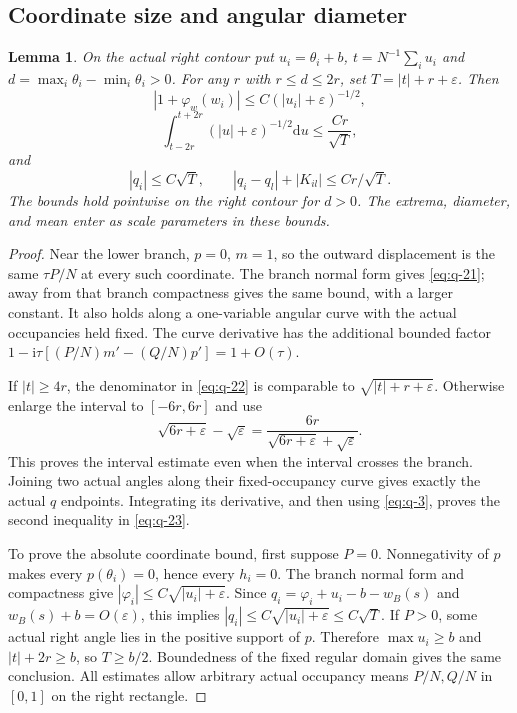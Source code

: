 \documentclass[11pt]{article}
\numberwithin{equation}{section}
\newtheorem{lemma}[theorem]{Lemma}
\theoremstyle{remark}\newtheorem{remark}[theorem]{Remark}
\newcommand{\ii}{\mathrm i}
\newcommand{\dd}{\mathrm d}
\begin{document}
\subsection{Coordinate size and angular diameter}

\begin{lemma}\label{lem:coordinate-scale}
On the actual right contour put
$u_i=\theta_i+b$, $t=N^{-1}\sum_i u_i$ and
$d=\max_i\theta_i-\min_i\theta_i>0$.
For any $r$ with $r\le d\le2r$, set $T=|t|+r+\varepsilon$.
Then
\begin{equation}\label{eq:q-21}
 |1+\varphi_w(w_i)|\le C(|u_i|+\varepsilon)^{-1/2},
\end{equation}
\begin{equation}\label{eq:q-22}
 \int_{t-2r}^{t+2r}(|u|+\varepsilon)^{-1/2}\dd u
       \le\frac{Cr}{\sqrt T},
\end{equation}
and
\begin{equation}\label{eq:q-23}
 |q_i|\le C\sqrt T,\qquad
 |q_i-q_l|+|K_{il}|\le Cr/\sqrt T.
\end{equation}
The bounds hold pointwise on the right contour for $d>0$. The
extrema, diameter, and mean enter as scale parameters in these bounds.
\end{lemma}
\begin{proof}
Near the lower branch, $p=0$, $m=1$, so the outward displacement
is the same $\tau P/N$ at every such coordinate. The branch normal
form gives \eqref{eq:q-21}; away from that branch compactness gives
the same bound, with a larger constant. It also holds along a
one-variable angular curve with the actual occupancies held fixed.
The curve derivative has the additional bounded factor
$1-\ii\tau[(P/N)m'-(Q/N)p']=1+O(\tau)$.

If $|t|\ge4r$, the denominator in \eqref{eq:q-22} is comparable
to $\sqrt{|t|+r+\varepsilon}$. Otherwise enlarge the interval to
$[-6r,6r]$ and use
\[
 \sqrt{6r+\varepsilon}-\sqrt\varepsilon
 =\frac{6r}{\sqrt{6r+\varepsilon}+\sqrt\varepsilon}.
\]
This proves the interval estimate even when the interval crosses
the branch. Joining two actual angles along their fixed-occupancy
curve gives exactly the actual $q$ endpoints. Integrating its
derivative, and then using \eqref{eq:q-3}, proves the second
inequality in \eqref{eq:q-23}.

To prove the absolute coordinate bound, first suppose $P=0$.
Nonnegativity of $p$ makes every $p(\theta_i)=0$, hence every
$h_i=0$. The branch normal form and compactness give
$|\varphi_i|\le C\sqrt{|u_i|+\varepsilon}$.
Since $q_i=\varphi_i+u_i-b-w_B(s)$ and
$w_B(s)+b=O(\varepsilon)$, this implies
$|q_i|\le C\sqrt{|u_i|+\varepsilon}\le C\sqrt T$.
If $P>0$, some actual right angle lies in the positive support
of $p$. Therefore $\max u_i\ge b$ and $|t|+2r\ge b$, so
$T\ge b/2$. Boundedness of the fixed regular domain gives the
same conclusion. All estimates allow arbitrary actual occupancy
means $P/N,Q/N$ in $[0,1]$ on the right rectangle.
\end{proof}
\end{document}
